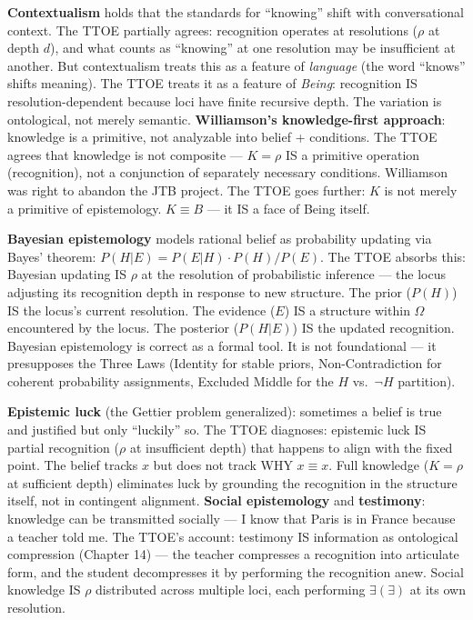 \documentclass[10pt, openany, oneside]{book}
\begin{document}
\textbf{Contextualism} holds that the standards for ``knowing'' shift with conversational context. The TTOE partially agrees: recognition operates at resolutions ($\rho$ at depth $d$), and what counts as ``knowing'' at one resolution may be insufficient at another. But contextualism treats this as a feature of \textit{language} (the word ``knows'' shifts meaning). The TTOE treats it as a feature of \textit{Being}: recognition IS resolution-dependent because loci have finite recursive depth. The variation is ontological, not merely semantic. \textbf{Williamson's knowledge-first approach}: knowledge is a primitive, not analyzable into belief + conditions. The TTOE agrees that knowledge is not composite --- $K = \rho$ IS a primitive operation (recognition), not a conjunction of separately necessary conditions. Williamson was right to abandon the JTB project. The TTOE goes further: $K$ is not merely a primitive of epistemology. $K \equiv B$ --- it IS a face of Being itself.

\textbf{Bayesian epistemology} models rational belief as probability updating via Bayes' theorem: $P(H|E) = P(E|H) \cdot P(H) / P(E)$. The TTOE absorbs this: Bayesian updating IS $\rho$ at the resolution of probabilistic inference --- the locus adjusting its recognition depth in response to new structure. The prior ($P(H)$) IS the locus's current resolution. The evidence ($E$) IS a structure within $\Omega$ encountered by the locus. The posterior ($P(H|E)$) IS the updated recognition. Bayesian epistemology is correct as a formal tool. It is not foundational --- it presupposes the Three Laws (Identity for stable priors, Non-Contradiction for coherent probability assignments, Excluded Middle for the $H$ vs.\ $\neg H$ partition).

\textbf{Epistemic luck} (the Gettier problem generalized): sometimes a belief is true and justified but only ``luckily'' so. The TTOE diagnoses: epistemic luck IS partial recognition ($\rho$ at insufficient depth) that happens to align with the fixed point. The belief tracks $x$ but does not track WHY $x \equiv x$. Full knowledge ($K = \rho$ at sufficient depth) eliminates luck by grounding the recognition in the structure itself, not in contingent alignment. \textbf{Social epistemology} and \textbf{testimony}: knowledge can be transmitted socially --- I know that Paris is in France because a teacher told me. The TTOE's account: testimony IS information as ontological compression (Chapter 14) --- the teacher compresses a recognition into articulate form, and the student decompresses it by performing the recognition anew. Social knowledge IS $\rho$ distributed across multiple loci, each performing $\exists(\exists)$ at its own resolution.
\end{document}
